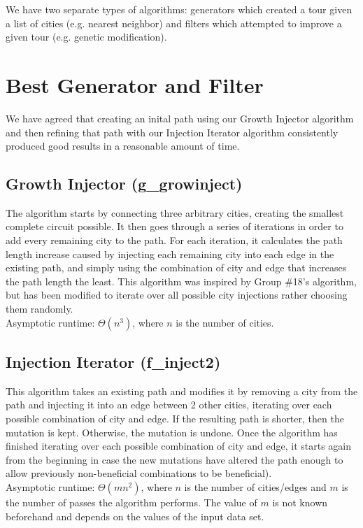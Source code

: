\documentclass{article}
\begin{document}
We have two separate types of algorithms: generators which created a tour given
a list of cities (e.g. nearest neighbor) and filters which attempted to improve
a given tour (e.g. genetic modification).

\section*{Best Generator and Filter}

We have agreed that creating an inital path using our Growth Injector algorithm
and then refining that path with our Injection Iterator algorithm consistently
produced good results in a reasonable amount of time.

\subsection*{Growth Injector (g\_growinject)}

The algorithm starts by connecting three arbitrary cities, creating the
smallest complete circuit possible. It then goes through a series of iterations
in order to add every remaining city to the path. For each iteration, it
calculates the path length increase caused by injecting each remaining city
into each edge in the existing path, and simply using the combination of city
and edge that increases the path length the least. This algorithm was inspired
by Group \#18's algorithm, but has been modified to iterate over all possible
city injections rather choosing them randomly.\\Asymptotic runtime: $\Theta
(n^3)$, where $n$ is the number of cities.

\subsection*{Injection Iterator (f\_inject2)}

This algorithm takes an existing path and modifies it by removing a city from
the path and injecting it into an edge between 2 other cities, iterating over
each possible combination of city and edge. If the resulting path is shorter,
then the mutation is kept. Otherwise, the mutation is undone. Once the
algorithm has finished iterating over each possible combination of city and
edge, it starts again from the beginning in case the new mutations have altered
the path enough to allow previously non-beneficial combinations to be
beneficial).\\Asymptotic runtime: $\Theta (mn^2)$, where $n$ is the number of
cities/edges and $m$ is the number of passes the algorithm performs. The value
of $m$ is not known beforehand and depends on the values of the input data set.
\end{document}
